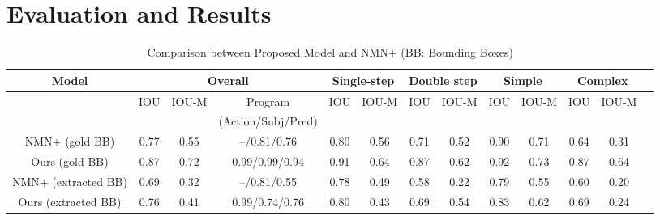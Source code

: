 \section{Evaluation and Results}\label{sec:evaluation}
%

\begin{table}[ht]
    \centering
    \caption{Comparison between Proposed Model and NMN+  (BB: Bounding Boxes)}
    \begin{tabular}{|c|c|c|c|c|c|c|c|c|c|c|c|c|}
    \hline
         Model  & \multicolumn{3}{|c|}{Overall} &  \multicolumn{2}{|c|}{Single-step} & \multicolumn{2}{|c|}{Double step} & \multicolumn{2}{|c|}{Simple} & \multicolumn{2}{|c|}{Complex} \\ 
         \hline
         \hline
          & IOU & IOU-M & Program & IOU & IOU-M  & IOU & IOU-M  & IOU & IOU-M & IOU & IOU-M  \\
           &  &  & (Action/Subj/Pred) & &   &  & &  &  &  &   \\
          \hline
         NMN+ (gold BB) & 0.77 & 0.55 & --/0.81/0.76 & 0.80 & 0.56 &    0.71 & 0.52 &0.90 & 0.71 & 0.64 & 0.31\\ 
         \hline 
         Ours (gold BB)  & 0.87 & 0.72& 0.99/0.99/0.94 & 0.91 & 0.64 &   0.87 & 0.62 & 0.92 & 0.73 & 0.87 & 0.64 \\
        \hline 
         NMN+ (extracted BB) & 0.69 & 0.32& --/0.81/0.55 & 0.78 & 0.49 &  0.58 & 0.22 & 0.79 & 0.55 & 0.60 & 0.20\\ 
         \hline 
         Ours (extracted BB) & 0.76  & 0.41  & 0.99/0.74/0.76 &0.80 & 0.43  & 0.69 & 0.54  & 0.83 & 0.62 & 0.69 & 0.24\\
         \hline 
    \end{tabular}
    \label{tab:accuracy}
\end{table} 


